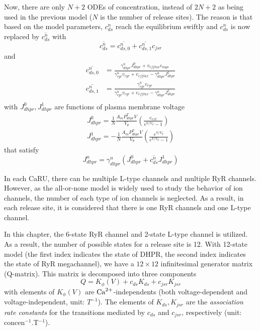 Now, there are only $N+2$ ODEs of concentration, instead of $2N+2$ as
being used in the previous model ($N$ is the number of release
sites). The reason is that based on the model parameters, $c^n_{ds}$
reach the equilibrium swiftly and $c^n_{ds}$ is now replaced by
$\overline{c^n_{ds}}$ with
\begin{equation}
  \label{eq:205}
  \overline{c^n_{ds}} =   \overline{c^n_{ds,0}} +  \overline{c^n_{ds,1}}  c_{jsr}
\end{equation}
and 
\begin{equation}
  \label{eq:206}
  \begin{split}
    \overline{c^n_{ds,0}} &= \frac{\gamma^n_{dhpr}J^0_{dhpr} +
      v_{efflux}c_{myo}}{\gamma^n_{ryr} v_{ryr} + v_{efflux} - \gamma^n_{dhpr}J^1_{dhpr}} \\
    \overline{c^n_{ds,1}} &=
    \frac{\gamma^n_{ryr}v_{ryr}}{\gamma^n_{ryr} v_{ryr} + v_{efflux}
      - \gamma^n_{dhpr}J^1_{dhpr}} \\
  \end{split}
\end{equation}
with $J^0_{dhpr}, J^1_{dhpr}$ are functions of plasma membrane voltage
\begin{equation}
  \label{eq:207}
  \begin{split}
    J^0_{dhpr} = \frac{1}{N} \frac{A_mP^T_{dhpr}V}{V_\theta} \left( \frac{c_{ext}}{e^{V/V_\theta}-1}  \right)\\
    J^1_{dhpr} =  -\frac{1}{N} \frac{A_mP^T_{dhpr}V}{V_\theta} \left( \frac{e^{V/V_\theta}}{e^{V/V_\theta}-1}  \right)
  \end{split}
\end{equation}
that satisfy
\begin{equation}
  \label{eq:208}
  J^n_{dhpr} =   \gamma^n_{dhpr} (J^0_{dhpr} + \overline{c^n_{ds}}  J^1_{dhpr})
\end{equation}

\begin{framed}
  In each CaRU, there can be multiple L-type channels and multiple RyR
  channels. However, as the all-or-none model is widely used to study
  the behavior of ion channels, the number of each type of ion channels
  is neglected. As a result, in each release site, it is considered that
  there is one RyR channels and one L-type channel. 
\end{framed}

In this chapter, the 6-state RyR channel and 2-state L-type channel is
utilized. As a result, the number of possible states for a release
site is 12.  With 12-state model (the first index indicates the state
of DHPR, the second index indicates the state of RyR megachannel), we
have a $12\times 12$ infinitesimal generator matrix (Q-matrix). This
matrix is decomposed into three components
\begin{equation}
  \label{eq:209}
  Q = K_\phi(V) + c_{ds}K_{ds} + c_{jsr} K_{jsr}
\end{equation}
with elements of $K_\phi(V)$ are ${\text{Ca}^{2+}}$-independents (both
voltage-dependent and voltage-independent, unit: $T^{-1}$). The
elements of $K_{ds}, K_{jsr}$ are the {\it association rate constants
} for the transitions mediated by $c_{ds}$ and $c_{jsr}$, respectively
(unit: concen$^{-1}$.T$^{-1}$). 

